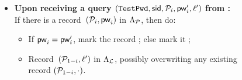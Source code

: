 \begin{figure}[htbp]
\begin{fboxenv}
\begin{minipage}{0.95\textwidth}
\begin{itemize}
\begin{itemize}
		\end{itemize}
		\vspace{3mm}
	\item
		\textbf{Upon receiving a query
			$(\texttt{TestPwd},\mathsf{sid},\mathcal{P}_{i},\mathsf{pw}_{i}',\ell')$ from \Sim{}:} \\
		If there is a  record~$(\mathcal{P}_{i},\mathsf{pw}_{i})$ in $\Lambda_{\mathcal{P}}$, then do:
		\begin{itemize}
			\item If $\mathsf{pw}_{i}=\mathsf{pw}_{i}'$, mark the record ; else mark it ;
			\item Record~$(\mathcal{P}_{1-i},\ell')$ in $\Lambda_{\mathcal{L}}$, possibly overwriting any existing record $(\mathcal{P}_{1-i},\cdot)$.


\end{itemize}
\end{itemize}
\end{minipage}
\end{fboxenv}
\end{figure}
